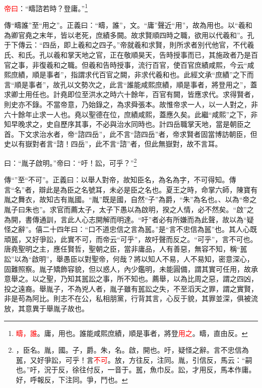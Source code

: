 \textcolor{red}{帝曰}：“疇諮若時？登庸。”\footnote{\textcolor{red}{疇，誰}。庸，用也。誰能咸熙庶績，順是事者，將登\textcolor{red}{用之}。疇，直由反。}

{\noindent\zhuan{}\fzbyks 傳“疇誰”至“用之”。正義曰：“疇，誰”，文。“庸”聲近“用”，故為用也。以“羲和為卿官堯之末年，皆以老死，庶績多闕。故求賢順四時之職，欲用以代羲和”。孔于下傳云：“四岳，即上羲和之四子。”帝就羲和求賢，則所求者別代他官，不代羲氏、和氏。孔以羲和掌天地之官，正在敬順昊天，告時授事而已，其施政者乃是百官之事，非復羲和之職。但羲和告時授事，流行百官，使百官庶績咸熙，今云“咸熙庶績，順是事者”，指謂求代百官之闕，非求代羲和也。此經文承“庶績”之下而言“順是事者”，故孔以文勢次之，此言“誰能咸熙庶績，順是事者，將登用之”，蓋求卿士用任也。計堯即位至洪水之時六十餘年，百官有闕，皆應求代。求得賢者，則史亦不錄。不當帝意，乃始錄之，為求舜張本。故惟帝求一人，以一人對之，非六十餘年止求一人也。堯以聖德在位，庶績咸熙，蓋應久矣。此繼“咸熙”之下，非知早晚求之，史自歷序其事，不必與治水同時也。計四岳職掌天地，當是朝臣之首。下文求治水者，帝“諮四岳”，此不言“諮四岳”者，帝求賢者固當博訪朝臣，但史以有嶽對者言“諮！四岳”，此不言“諮”者，但此無嶽對，故不言耳。 \par}

曰：“胤子啟明。”帝曰：“吁！訟，可乎？”\footnote{\textcolor{red}{}，臣名。胤，國。子，爵。朱，名。啟，開也。吁，疑怪之辭。言不忠信為嚚，又好爭訟，可乎！言\textcolor{red}{不可}。放，方往反，注同。胤，引信反，馬云：“嗣也。”吁，況于反，徐往付反，一音于。嚚，魚巾反。訟，才用反，馬本作庸。好，呼報反，下注同。爭，鬥也。}

{\noindent\zhuan{}\fzbyks 傳“”至“不可”。正義曰：以舉人對帝，故知臣名，為名為字，不可得知。傳言“名”者，辯此是為臣之名號耳，未必是臣之名也。夏王之時，命掌六師，陳寶有胤之舞衣，故知古有胤國。“胤”既是國，自然“子”為爵，“朱”為名也。、以為“帝之胤子曰朱也”。求官而薦太子，太子下愚以為啟明，揆之人情，必不然矣。“啟”之為開，書傳通訓，言此人心志開解而明達。“吁”者必有所嫌而為此聲，故以為“疑怪之辭”。僖二十四年曰：“口不道忠信之言為嚚。”是“言不忠信為嚚”也。其人心既頑嚚，又好爭訟，此實不可，而帝云“可乎”，故吁聲而反之。“可乎”，言不可也。唐堯聖明之主，應任賢哲，聖朝之臣，當非庸品，人有善惡，無容不知，稱“嚚訟”以為“啟明”，舉愚臣以對聖帝，何哉？將以知人不易，人不易知，密意深心，固難照察。胤子矯飾容貌，但以惑人，內少鑑明，未能圓備，謂其實可任用，故承意舉之。以之聖，乃知其嚚訟之事，所不知也。薦舉，以為比周之惡，謂之四凶，投之遠裔。舉胤子，不為兇人者，胤子雖有嚚訟之失，不至滔天之罪，謂之實賢，非是苟為阿比。則志不在公，私相朋黨，行背其言，心反于貌，其罪並深，俱被流放，其意異于舉胤子故也。 \par}

